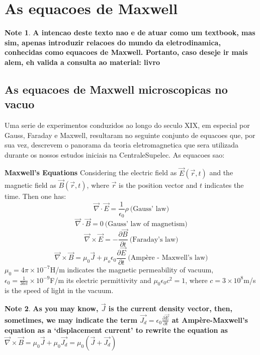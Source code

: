 \documentclass[11pt]{article}
\theoremstyle{definition}
\newtheorem{note}{Note}
\begin{document}
\section{As equacoes de Maxwell}
\begin{note}
    \textbf{A intencao deste texto nao e de atuar como um textbook, mas sim, apenas introduzir relacoes do mundo da eletrodinamica,
    conhecidas como equacoes de Maxwell. Portanto, caso deseje ir mais alem, eh valida a consulta ao material: livro}
\end{note}
\subsection{As equacoes de Maxwell microscopicas no vacuo}
Uma serie de experimentos conduzidos ao longo do seculo XIX, em especial por Gauss, Faraday e Maxwell, resultaram no seguinte conjunto de equacoes que,
por sua vez, descrevem o panorama da teoria eletromagnetica que sera utilizada durante os nossos estudos iniciais na CentraleSupelec. As equacoes sao:
\begin{shaded}
    \textbf{Maxwell's Equations}\newline
    Considering the electric field as $\vec{E}\left(\vec{r},t\right)$ and the magnetic field as $\vec{B}\left(\vec{r},t\right)$, where $\vec{r}$ is the position vector and $t$ indicates the time. Then one has:
    \begin{equation}
    \vec{\nabla} \cdot \vec{E} = \frac{1}{\epsilon_0}\rho \ \text{(Gauss' law)}
    \end{equation}
    \begin{equation}
        \vec{\nabla} \cdot \vec{B} = 0 \ \text{(Gauss' law of magnetism)}
    \end{equation}
    \begin{equation}
        \vec{\nabla} \times \vec{E} = -\frac{\partial \vec{B}}{\partial t} \ \text{(Faraday's law)}
    \end{equation}
    \begin{equation}
        \vec{\nabla} \times \vec{B} = \mu_0 \vec{J} + \mu_o \epsilon_0 \frac{\partial \vec{E}}{\partial t} \ \text{(Ampère - Maxwell's law)}
    \end{equation}
$\mu_0 = 4\pi \times 10^{-7}$H/m indicates the magnetic permeability of vacuum, $\epsilon_0 = \frac{1}{36\pi}\times 10^{-9}$F/m its electric permittivity and $\mu_0 \epsilon_0 c^2 = 1$, where $c = 3 \times 10^{8}$m/s is the speed of light in the vacuum.
\begin{note}
    \textbf{As you may know, $\vec{J}$ is the current density vector, then, sometimes, we may indicate the term $\vec{J_{d}} = \epsilon_0 \frac{\partial \vec{E}}{\partial t}$ at Ampère-Maxwell's equation as a `displacement current' to rewrite the equation as
    $\vec{\nabla} \times \vec{B} = \mu_0 \vec{J} + \mu_0 \vec{J_{d}} = \mu_0 \left(\vec{J} + \vec{J_{d}}\right)$}
\end{note}
\end{shaded}
\end{document}
